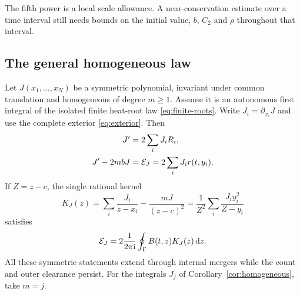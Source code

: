 The fifth power is a local scale allowance. A near-conservation
estimate over a time interval still needs bounds on the initial
value, $b$, $C_2$ and $\rho$ throughout that interval.

\subsection{The general homogeneous law}
\begin{theorem}
\label{thm:general-flux}
Let $J(x_1,\ldots,x_N)$ be a symmetric polynomial, invariant under
common translation and homogeneous of degree $m\ge1$. Assume it
is an autonomous first integral of the isolated finite heat-root
law \eqref{eq:finite-roots}. Write $J_i=\partial_{x_i}J$ and use
the complete exterior \eqref{eq:exterior}. Then
\begin{align}
 J'&=2\sum_i J_iR_i, \label{eq:Jflux}\\
 J'-2mbJ&=\mathcal E_J=2\sum_iJ_i r(t,y_i). \label{eq:Jaffine}
\end{align}
If $Z=z-c$, the single rational kernel
\begin{equation}
 K_J(z)=\sum_i\frac{J_i}{z-x_i}-\frac{mJ}{(z-c)^2}
       =\frac1{Z^2}\sum_i\frac{J_i y_i^2}{Z-y_i}
 \label{eq:Kgeneral}
\end{equation}
satisfies
\begin{equation}
 \mathcal E_J=2\frac{1}{2\pi\mathrm i}\oint_\Gamma B(t,z)K_J(z)\,\mathrm d z.
 \label{eq:contour-general}
\end{equation}
All these symmetric statements extend through internal mergers
while the count and outer clearance persist. For the integrals
$J_j$ of Corollary~\ref{cor:homogeneous}, take $m=j$.
\end{theorem}
